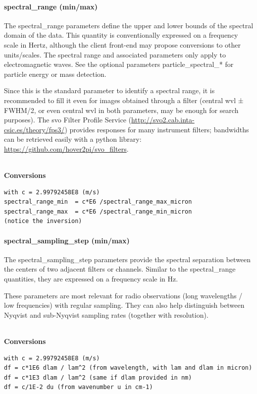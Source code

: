 \documentclass[11pt,a4paper]{ivoa}
\begin{document}
\paragraph{spectral\_range (min/max)}

The spectral\_range parameters define the upper and lower bounds of the
spectral domain of the data. This quantity is conventionally expressed
on a frequency scale in Hertz, although the client front-end may propose
conversions to other units/scales. The spectral range and associated
parameters only apply to electromagnetic waves. See the optional
parameters particle\_spectral\_* for particle energy or mass detection.

Since this is the standard parameter to identify a spectral range, it
is recommended to fill it even for images obtained through a filter
(central wvl ± FWHM/2, or even central wvl in both parameters,
may be enough for search purposes). The svo Filter Profile Service
(\url{http://svo2.cab.inta-csic.es/theory/fps3/})
provides responses for many instrument filters;
bandwidths can be retrieved easily with a python library:
\url{https://github.com/hover2pi/svo_filters}.

\textbf{\\}
\textbf{Conversions}

\begin{verbatim}
with c = 2.99792458E8 (m/s)
spectral_range_min  = c*E6 /spectral_range_max_micron
spectral_range_max  = c*E6 /spectral_range_min_micron
(notice the inversion)
\end{verbatim}

\paragraph{spectral\_sampling\_step (min/max)}

The spectral\_sampling\_step parameters provide the spectral separation
between the centers of two adjacent filters or channels. Similar to the
spectral\_range quantities, they are expressed on a frequency scale in Hz.

These parameters are most relevant for radio observations
(long wavelengths / low frequencies) with regular sampling.
They can also help distinguish between Nyqvist and sub-Nyqvist
sampling rates (together with resolution).

\textbf{\\}
\textbf{Conversions}

\begin{verbatim}
with c = 2.99792458E8 (m/s)
df = c*1E6 dlam / lam^2 (from wavelength, with lam and dlam in micron)
df = c*1E3 dlam / lam^2 (same if dlam provided in nm)
df = c/1E-2 du (from wavenumber u in cm-1)
\end{verbatim}
\end{document}
